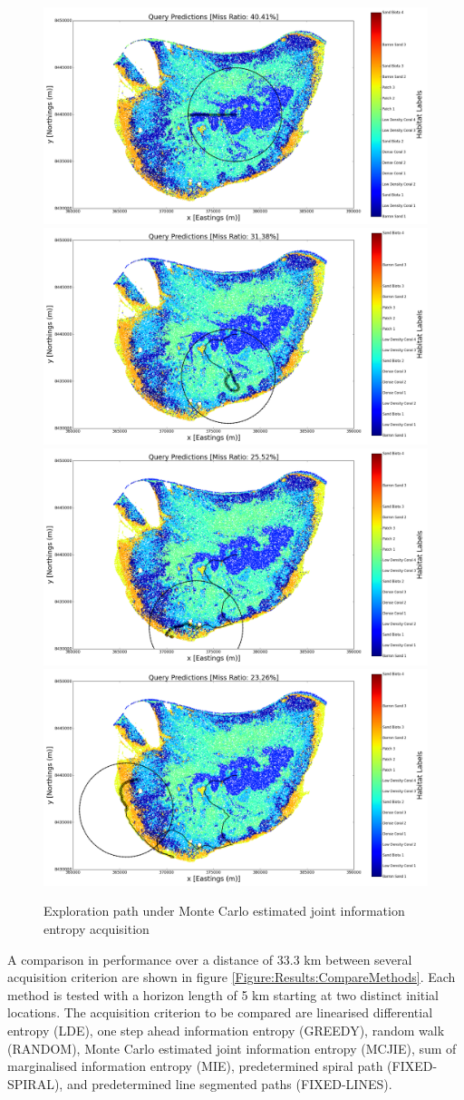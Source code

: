 \documentclass{article}
\begin{document}
\begin{figure}[!htbp]
			\includegraphics[width = 0.24\linewidth]{Figures/location_1_mcje_path/pred_propose_step1.png}
			\includegraphics[width = 0.24\linewidth]{Figures/location_1_mcje_path/pred_propose_step50.png}
			\includegraphics[width = 0.24\linewidth]{Figures/location_1_mcje_path/pred_propose_step100.png}
			\includegraphics[width = 0.24\linewidth]{Figures/location_1_mcje_path/pred_propose_step200.png}			
		\caption{Exploration path under Monte Carlo estimated joint information entropy acquisition}
		\label{Figure:Results:OptimalPathMCJE}
		\end{figure}
		
		A comparison in performance over a distance of 33.3 km between several acquisition criterion are shown in figure \ref{Figure:Results:CompareMethods}. Each method is tested with a horizon length of 5 km starting at two distinct initial locations. The acquisition criterion to be compared are linearised differential entropy (LDE), one step ahead information entropy (GREEDY), random walk (RANDOM), Monte Carlo estimated joint information entropy (MCJIE), sum of marginalised information entropy (MIE), predetermined spiral path (FIXED-SPIRAL), and predetermined line segmented paths (FIXED-LINES).
	
\end{document}
